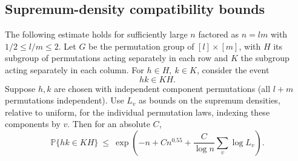 \subsection{Supremum-density compatibility bounds}
\begin{proposition}\label{tra:collision-series:compatibility}
\label{tra:collision-series:compatibility-statement}
The following estimate holds for sufficiently large \(n\) factored as \(n=l m\) with \(1/2\le l/m\le 2\). Let \(G\) be the permutation group of \([l]\times[m]\), with \(H\) its subgroup of permutations acting separately in each row and \(K\) the subgroup acting separately in each column. For \(h\in H,\ k\in K\), consider the event
\begin{equation}
hk\in KH. \label{tra:collision-series:eq2}
\end{equation}
Suppose \(h,k\) are chosen with independent component permutations (all \(l+m\) permutations independent). Use \(L_v\) as bounds on the supremum densities, relative to uniform, for the individual permutation laws, indexing these components by \(v\). Then for an absolute \(C\),
\begin{equation}
\mathbb P\{hk\in KH\}
\ \le\
\exp\left(-n+C n^{0.55}+\frac{C}{\log n}\sum_v\log L_v\right). \label{tra:collision-series:eq3}
\end{equation}
\end{proposition}
